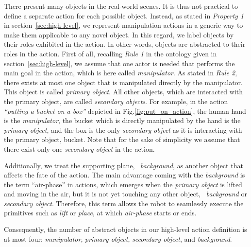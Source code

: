 There present many  objects in the real-world scenes.
It is thus not practical to define a separate action for each possible object.
Instead, as stated in {\it Property 1}  in section~\ref{sec:high-level}, we represent manipulation actions in a generic way to make them applicable to any novel object.
In this regard, we label objects by their roles exhibited in the action. In other words, objects are abstracted to their roles in the action.
First of all, recalling {\it Rule 1} in the ontology given in section~\ref{sec:high-level}, we assume that one actor is needed that performs the main goal in the action, which is here called \textit{manipulator}. As stated in {\it Rule 2}, there exists at most one object that is manipulated directly by the manipulator.
This object is called \textit{primary object}. All other objects, which are interacted with the primary object, are called {\it secondary objects}.
For example, in the action {\it ``putting a bucket on a box''}  depicted in Fig.\ref{fig:put_on_action}, the human hand is the \textit{manipulator}, the bucket which is directly manipulated by the hand is the \textit{primary object}, and the box is the only {\it secondary object} as it is interacting with the primary object, \ie bucket.
Note that for the sake of simplicity we assume that there exist only one {\it secondary object} in the action. 

Additionally, we treat the supporting plane, \ie~{\it background}, as another object that affects the fate of the action. The main advantage coming with the {\it background} is the term ``air-phase'' in actions, 
which emerges when the \textit{primary object} is lifted and moving in the air, but it is not yet touching any other object, \eg~{\it background} or \textit{secondary object}. Therefore, this term allows the robot to seamlessly execute the primitives such as {\it lift} or {\it place}, at which {\it air-phase} starts or ends.

Consequently, the number of abstract objects in our high-level action definition is at most four: \textit{manipulator}, \textit{primary object}, \textit{secondary object}, and {\it background}.
 







